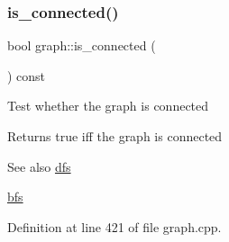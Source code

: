 \subsubsection{\texorpdfstring{is\+\_\+connected()}{is\_connected()}}
{\footnotesize\ttfamily bool graph\+::is\+\_\+connected (\begin{DoxyParamCaption}{ }\end{DoxyParamCaption}) const}

Test whether the graph is connected

\begin{DoxyReturn}{Returns}
true iff the graph is connected 
\end{DoxyReturn}
\begin{DoxySeeAlso}{See also}
\mbox{\hyperlink{classdfs}{dfs}} 

\mbox{\hyperlink{classbfs}{bfs}} 
\end{DoxySeeAlso}


Definition at line 421 of file graph.\+cpp.


